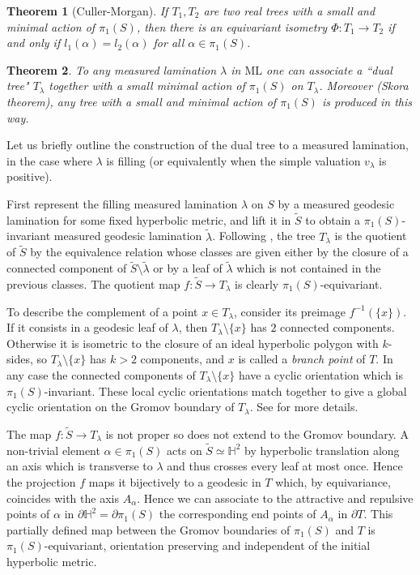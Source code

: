 \documentclass{amsart}
\newtheorem{theorem}{Theorem}
\newcommand{\ML}{\mathrm{ML}}
\renewcommand{\H}{\mathbb{H}}
\begin{document}
\begin{theorem}[Culler-Morgan]
If $T_1,T_2$ are two real trees with a small and minimal action of $\pi_1(S)$, then there is an equivariant isometry $\Phi:T_1\to T_2$ if and only if $l_1(\alpha)=l_2(\alpha)$ for all $\alpha\in \pi_1(S)$.
\end{theorem}

\begin{theorem}
To any measured lamination $\lambda$ in $\ML$ one can associate a ``dual tree" $T_\lambda$ together with a small minimal action of $\pi_1(S)$ on $T_\lambda$. Moreover (Skora theorem), any tree with a small and minimal action of $\pi_1(S)$ is produced in this way. 
\end{theorem}

Let us briefly outline the construction of the dual tree to a measured lamination, in the case where $\lambda$ is filling (or equivalently when the simple valuation $v_\lambda$ is positive).

First represent the filling measured lamination $\lambda$ on $S$ by a measured geodesic lamination for some fixed hyperbolic metric, and lift it in $\tilde{S}$ to obtain a $\pi_1(S)$-invariant measured geodesic lamination $\tilde{\lambda}$. Following \cite[Section 2.3]{Otal_hyperbolization}, the tree $T_\lambda$ is the quotient of $\tilde{S}$ by the equivalence relation whose classes are given either by the closure of a connected component of $\tilde{S}\setminus \tilde{\lambda}$ or by a leaf of $\tilde{\lambda}$ which is not contained in the previous classes. The quotient map $f\colon \tilde{S}\to T_\lambda$ is clearly $\pi_1(S)$-equivariant.

To describe the complement of a point $x\in T_\lambda$, consider its preimage $f^{-1}(\{x\})$. If it consists in a geodesic leaf of $\lambda$, then $T_\lambda\setminus \{x\}$ has $2$ connected components. Otherwise it is isometric to the closure of an ideal hyperbolic polygon with $k$-sides, so $T_\lambda\setminus \{x\}$ has $k>2$ components, and $x$ is called a \emph{branch point} of $T$.
%
In any case the connected components of $T_\lambda\setminus\{x\}$ have a cyclic orientation which is $\pi_1(S)$-invariant.
%
These local cyclic orientations match together to give a global cyclic orientation on the Gromov boundary of $T_\lambda$. See \cite{Wolff_compactification_2011} for more details.

The map $f:\tilde{S}\to T_\lambda$ is not proper so does not extend to the Gromov boundary.
%
A non-trivial element $\alpha\in \pi_1(S)$ acts on $\tilde{S}\simeq \H^2$ by hyperbolic translation along an axis which is transverse to $\lambda$ and thus crosses every leaf at most once. Hence the projection $f$ maps it bijectively to a geodesic in $T$ which, by equivariance, coincides with the axis $A_\alpha$. Hence we can associate to the attractive and repulsive points of $\alpha$ in $\partial \H^2=\partial \pi_1(S)$ the corresponding end points of $A_\alpha$ in $\partial T$. This partially defined map between the Gromov boundaries of $\pi_1(S)$ and $T$ is $\pi_1(S)$-equivariant, orientation preserving and independent of the initial hyperbolic metric.
\end{document}
